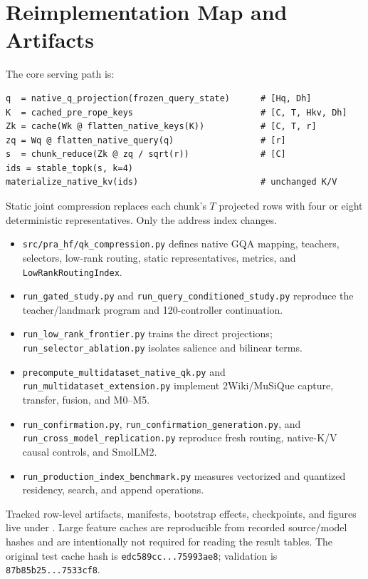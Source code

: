 \documentclass[11pt]{article}
\newcommand{\kv}{\textsc{K/V}\xspace}
\begin{document}
\section{Reimplementation Map and Artifacts}
The core serving path is:
\begin{verbatim}
q  = native_q_projection(frozen_query_state)      # [Hq, Dh]
K  = cached_pre_rope_keys                         # [C, T, Hkv, Dh]
Zk = cache(Wk @ flatten_native_keys(K))           # [C, T, r]
zq = Wq @ flatten_native_query(q)                 # [r]
s  = chunk_reduce(Zk @ zq / sqrt(r))              # [C]
ids = stable_topk(s, k=4)
materialize_native_kv(ids)                        # unchanged K/V
\end{verbatim}
Static joint compression replaces each chunk's $T$ projected rows with four or
eight deterministic representatives. Only the address index changes.

\begin{itemize}[leftmargin=*]
  \item \texttt{src/pra\_hf/qk\_compression.py} defines native GQA mapping,
  teachers, selectors, low-rank routing, static representatives, metrics, and
  \texttt{LowRankRoutingIndex}.
  \item \texttt{run\_gated\_study.py} and \texttt{run\_query\_conditioned\_study.py}
  reproduce the teacher/landmark program and 120-controller continuation.
  \item \texttt{run\_low\_rank\_frontier.py} trains the direct projections;
  \texttt{run\_selector\_ablation.py} isolates salience and bilinear terms.
  \item \texttt{precompute\_multidataset\_native\_qk.py} and
  \texttt{run\_multidataset\_extension.py} implement 2Wiki/MuSiQue capture,
  transfer, fusion, and M0--M5.
  \item \texttt{run\_confirmation.py}, \texttt{run\_confirmation\_generation.py},
  and \texttt{run\_cross\_model\_replication.py} reproduce fresh routing,
  native-\kv causal controls, and SmolLM2.
  \item \texttt{run\_production\_index\_benchmark.py} measures vectorized and
  quantized residency, search, and append operations.
\end{itemize}

Tracked row-level artifacts, manifests, bootstrap effects, checkpoints, and
figures live under
. Large feature caches
are reproducible from recorded source/model hashes and are intentionally not
required for reading the result tables. The original test cache hash is
\texttt{edc589cc...75993ae8}; validation is
\texttt{87b85b25...7533cf8}.
\end{document}
